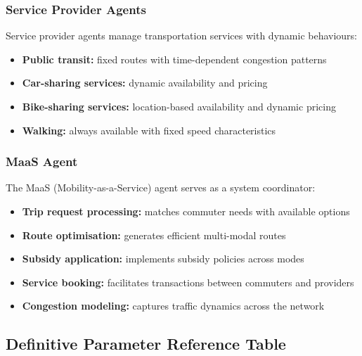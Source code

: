\subsubsection{Service Provider Agents}
Service provider agents manage transportation services with dynamic behaviours:
\begin{itemize}
    \item \textbf{Public transit:} fixed routes with time-dependent congestion patterns
    \item \textbf{Car-sharing services:} dynamic availability and pricing
    \item \textbf{Bike-sharing services:} location-based availability and dynamic pricing
    \item \textbf{Walking:} always available with fixed speed characteristics
\end{itemize}

\subsubsection{MaaS Agent}
The MaaS (Mobility-as-a-Service) agent serves as a system coordinator:
\begin{itemize}
    \item \textbf{Trip request processing:} matches commuter needs with available options
    \item \textbf{Route optimisation:} generates efficient multi-modal routes
    \item \textbf{Subsidy application:} implements subsidy policies across modes
    \item \textbf{Service booking:} facilitates transactions between commuters and providers
    \item \textbf{Congestion modeling:} captures traffic dynamics across the network
\end{itemize}


\subsection{Definitive Parameter Reference Table}
\label{app:definitive_params}

